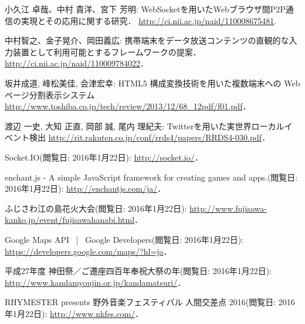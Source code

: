 \begin{thebibliography}{99}
        小久江 卓哉、中村 貴洋、宮下 芳明:
        WebSocketを用いたWebブラウザ間P2P通信の実現とその応用に関する研究．
        \url{http://ci.nii.ac.jp/naid/110008675481}.

        中村智之、金子晃介、岡田義広:
        携帯端末をデータ放送コンテンツの直観的な入力装置として利用可能とするフレームワークの提案．
        \url{http://ci.nii.ac.jp/naid/110009784022}．

        坂井成道, 峰松美佳, 会津宏幸:
        HTML5 構成変換技術を用いた複数端末への Web ページ分割表示システム
        \url{http://www.toshiba.co.jp/tech/review/2013/12/68_12pdf/f01.pdf}．

        渡辺 一史, 大知 正直, 岡部 誠, 尾内 理紀夫:
        Twitterを用いた実世界ローカルイベント検出
        \url{http://rit.rakuten.co.jp/conf/rrds4/papers/RRDS4-030.pdf}．

        Socket.IO(閲覧日: 2016年1月22日):
        \url{http://socket.io/}．

        enchant.js - A simple JavaScript framework for creating games and apps.(閲覧日: 2016年1月22日):
        \url{http://enchantjs.com/ja/}．

        ふじさわ江の島花火大会(閲覧日: 2016年1月22日):
        \url{http://www.fujisawa-kanko.jp/event/fujisawahanabi.html}．

        Google Maps API  |  Google Developers(閲覧日: 2016年1月22日):
        \url{https://developers.google.com/maps/?hl=ja}．

        平成27年度 神田祭／ご遷座四百年奉祝大祭の年(閲覧日: 2016年1月22日):
        \url{http://www.kandamyoujin.or.jp/kandamatsuri/}．

        RHYMESTER presents 野外音楽フェスティバル 人間交差点 2016(閲覧日: 2016年1月22日):
        \url{http://www.nkfes.com/}．

\end{thebibliography}
